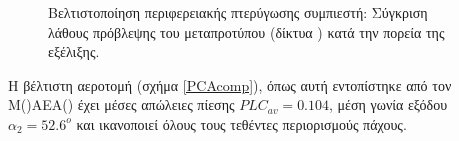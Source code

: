 \begin{figure}[h!]
\begin{minipage}[b]{1\linewidth}
 \centering
\end{minipage}
\caption{Βελτιστοποίηση περιφερειακής πτερύγωσης συμπιεστή: Σύγκριση λάθους πρόβλεψης του μεταπροτύπου (δίκτυα ) κατά την πορεία της εξέλιξης.} 
\label{PCAcomp2}
\end{figure}
\newpage
Η βέλτιστη αεροτομή (σχήμα \ref{PCAcomp}), όπως αυτή εντοπίστηκε από τον \linebreak Μ()ΑΕΑ() έχει μέσες απώλειες πίεσης $PLC_{av}=0.104$, μέση γωνία εξόδου $\alpha_2=52.6^o$ και ικανοποιεί όλους τους τεθέντες περιορισμούς πάχους.





